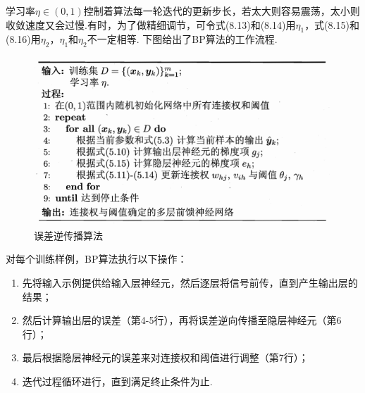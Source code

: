 \documentclass[openany]{progbookcn}
\begin{document}
\indent 学习率$\eta\in(0,1)$控制着算法每一轮迭代的更新步长，若太大则容易震荡，太小则收敛速度又会过慢.有时，为了做精细调节，可令式(8.13)和(8.14)用$\eta_1$，式(8.15)和(8.16)用$\eta_2$，$\eta_1$和$\eta_2$不一定相等.
\indent 下图给出了BP算法的工作流程.
\begin{figure}[H]
    \centering
    \includegraphics[width=0.6 \textwidth]{figs/chapter8/误差逆传播算法}
    \caption{误差逆传播算法}
\end{figure}
\indent 对每个训练样例，BP算法执行以下操作：
\begin{enumerate}[itemindent=2em]
    \item 先将输入示例提供给输入层神经元，然后逐层将信号前传，直到产生输出层的结果；
    \item 然后计算输出层的误差（第4-5行），再将误差逆向传播至隐层神经元（第6行）；
    \item 最后根据隐层神经元的误差来对连接权和阈值进行调整（第7行）；
    \item 迭代过程循环进行，直到满足终止条件为止.
\end{enumerate}
\end{document}
